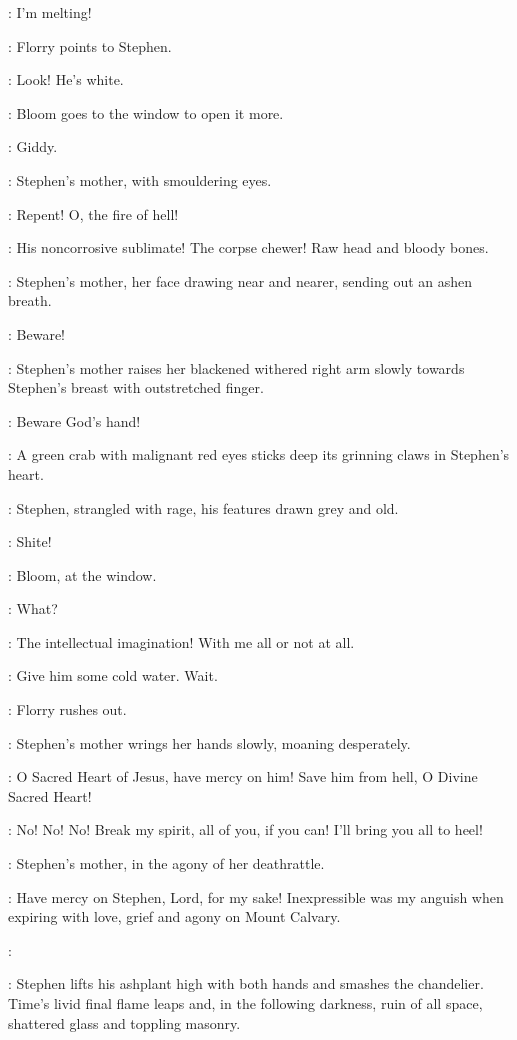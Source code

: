 \Zoe:
I'm melting!

:
Florry points to Stephen.

\Florry:
Look!
He's white.

:
Bloom goes to the window to open it more.

\Bloom:
Giddy.

:
Stephen's mother, with smouldering eyes.

\Mother:
Repent!
O, the fire of hell!

\Stephen:
His noncorrosive sublimate!
The corpse chewer!
Raw head and bloody bones.

:
Stephen's mother, her face drawing near and nearer, sending out an ashen breath.

\Mother:
Beware!

:
Stephen's mother raises her blackened withered right arm slowly
towards Stephen's breast with outstretched finger.

\Mother:
Beware God's hand!

:
A green crab with malignant red eyes sticks deep
its grinning claws in Stephen's heart.

:
Stephen, strangled with rage, his features drawn grey and old.

\Stephen:
Shite!

:
Bloom, at the window.

\Bloom:
What?

\Stephen:
The intellectual imagination!
With me all or not at all.

\Florry:
Give him some cold water.
Wait.

:
Florry rushes out.

:
Stephen's mother wrings her hands slowly, moaning desperately.

\Mother:
O Sacred Heart of Jesus, have mercy on him!
Save him from hell, O Divine Sacred Heart!

\Stephen:
No! No! No!
Break my spirit, all of you, if you can!
I'll bring you all to heel!

:
Stephen's mother, in the agony of her deathrattle.

\Mother:
Have mercy on Stephen, Lord, for my sake!
Inexpressible was my anguish when expiring with love, grief and agony
on Mount Calvary.

\Stephen:

:
Stephen lifts his ashplant high with both hands and smashes the chandelier.
Time's livid final flame leaps and, in the following darkness,
ruin of all space, shattered glass and toppling masonry.

